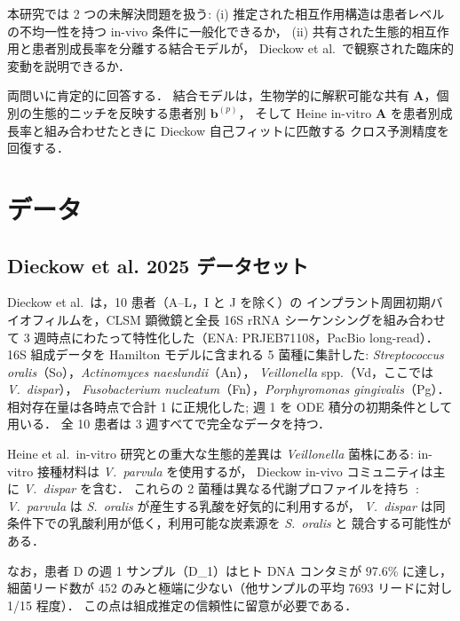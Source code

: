\documentclass[11pt,a4paper]{article}
\newcommand{\bA}{\mathbf{A}}
\newcommand{\bb}{\mathbf{b}}
\begin{document}
本研究では 2 つの未解決問題を扱う:
(i) 推定された相互作用構造は患者レベルの不均一性を持つ in-vivo 条件に一般化できるか，
(ii) 共有された生態的相互作用と患者別成長率を分離する結合モデルが，
Dieckow et al.~\cite{Dieckow2025InVivo}で観察された臨床的変動を説明できるか．

両問いに肯定的に回答する．
結合モデルは，生物学的に解釈可能な共有 $\bA$，個別の生態的ニッチを反映する患者別 $\bb^{(p)}$，
そして Heine in-vitro $\bA$ を患者別成長率と組み合わせたときに Dieckow 自己フィットに匹敵する
クロス予測精度を回復する．

\section{データ}
\label{sec:data}

\subsection{Dieckow et al. 2025 データセット}

Dieckow et al.~\cite{Dieckow2025InVivo}は，10 患者（A--L，I と J を除く）の
インプラント周囲初期バイオフィルムを，CLSM 顕微鏡と全長 16S rRNA シーケンシングを組み合わせて
3 週時点にわたって特性化した（ENA: PRJEB71108，PacBio long-read）．
16S 組成データを Hamilton モデルに含まれる 5 菌種に集計した:
\textit{Streptococcus oralis}（So），\textit{Actinomyces naeslundii}（An），
\textit{Veillonella} spp.（Vd，ここでは \textit{V.~dispar}），
\textit{Fusobacterium nucleatum}（Fn），\textit{Porphyromonas gingivalis}（Pg）．
相対存在量は各時点で合計 1 に正規化した; 週 1 を ODE 積分の初期条件として用いる．
全 10 患者は 3 週すべてで完全なデータを持つ．

Heine et al.\ in-vitro 研究との重大な生態的差異は \textit{Veillonella} 菌株にある:
in-vitro 接種材料は \textit{V.~parvula} を使用するが，
Dieckow in-vivo コミュニティは主に \textit{V.~dispar} を含む．
これらの 2 菌種は異なる代謝プロファイルを持ち~\cite{Rogosa1965Veillonella}:
\textit{V.~parvula} は \textit{S.~oralis} が産生する乳酸を好気的に利用するが，
\textit{V.~dispar} は同条件下での乳酸利用が低く，利用可能な炭素源を \textit{S.~oralis} と
競合する可能性がある．

なお，患者 D の週 1 サンプル（D\_1）はヒト DNA コンタミが 97.6\% に達し，
細菌リード数が 452 のみと極端に少ない（他サンプルの平均 7693 リードに対し 1/15 程度）．
この点は組成推定の信頼性に留意が必要である．
\end{document}
